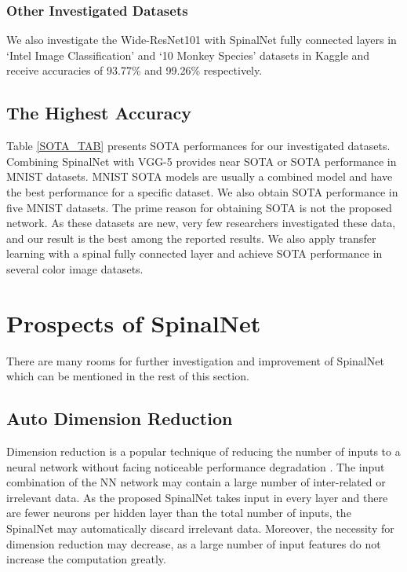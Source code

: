 \documentclass[journal]{IEEEtran}
\begin{document}
\subsubsection{Other Investigated Datasets}
We also investigate the Wide-ResNet101 with SpinalNet fully connected layers in `Intel Image Classification' and `10 Monkey Species' datasets in Kaggle and receive accuracies of 93.77\% and 99.26\% respectively. 

\subsection{The Highest Accuracy}
Table \ref{SOTA_TAB} presents SOTA performances for our investigated datasets. Combining SpinalNet with VGG-5 provides near SOTA or SOTA performance in MNIST datasets. MNIST SOTA models are usually a combined model and have the best performance for a specific dataset. We also obtain SOTA performance in five MNIST datasets. The prime reason for obtaining SOTA is not the proposed network. As these datasets are new, very few researchers investigated these data, and our result is the best among the reported results. We also apply transfer learning with a spinal fully connected layer and achieve SOTA performance in several color image datasets.



\section{Prospects of SpinalNet}
There are many rooms for further investigation and improvement of SpinalNet which can be mentioned in the rest of this section.

\subsection{Auto Dimension Reduction}
Dimension reduction is a popular technique of reducing the number of inputs to a neural network without facing noticeable performance degradation \cite{vohra2019active}. The input combination of the NN network may contain a large number of inter-related or irrelevant data. As the proposed SpinalNet takes input in every layer and there are fewer neurons per hidden layer than the total number of inputs, the SpinalNet may automatically discard irrelevant data. Moreover, the necessity for dimension reduction may decrease, as a large number of input features do not increase the computation greatly.    
\end{document}
